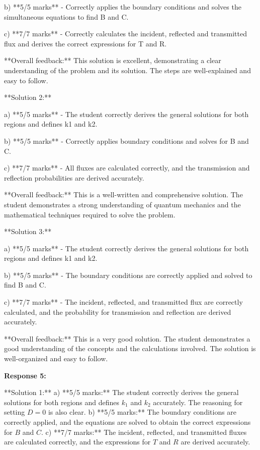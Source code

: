 \documentclass[a4paper,11pt]{article}
\begin{document}
b) **5/5 marks** - Correctly applies the boundary conditions and solves the simultaneous equations to find B and C.

c) **7/7 marks** - Correctly calculates the incident, reflected and transmitted flux and derives the correct expressions for T and R.

**Overall feedback:** This solution is excellent, demonstrating a clear understanding of the problem and its solution. The steps are well-explained and easy to follow. 

**Solution 2:**

a) **5/5 marks** - The student correctly derives the general solutions for both regions and defines k1 and k2.

b) **5/5 marks** - Correctly applies boundary conditions and solves for B and C.

c) **7/7 marks** - All fluxes are calculated correctly, and the transmission and reflection probabilities are derived accurately.

**Overall feedback:** This is a well-written and comprehensive solution. The student demonstrates a strong understanding of quantum mechanics and the mathematical techniques required to solve the problem.

**Solution 3:**

a) **5/5 marks** - The student correctly derives the general solutions for both regions and defines k1 and k2.

b) **5/5 marks** - The boundary conditions are correctly applied and solved to find B and C.

c) **7/7 marks** - The incident, reflected, and transmitted flux are correctly calculated, and the probability for transmission and reflection are derived accurately.

**Overall feedback:** This is a very good solution. The student demonstrates a good understanding of the concepts and the calculations involved. The solution is well-organized and easy to follow.


\textbf{Response 5:}

**Solution 1:**
a) **5/5 marks:** The student correctly derives the general solutions for both regions and defines \( k_1 \) and \( k_2 \) accurately. The reasoning for setting \(D=0\) is also clear.
b) **5/5 marks:** The boundary conditions are correctly applied, and the equations are solved to obtain the correct expressions for \(B\) and \(C\).
c) **7/7 marks:** The incident, reflected, and transmitted fluxes are calculated correctly, and the expressions for \(T\) and \(R\) are derived accurately.
\end{document}
